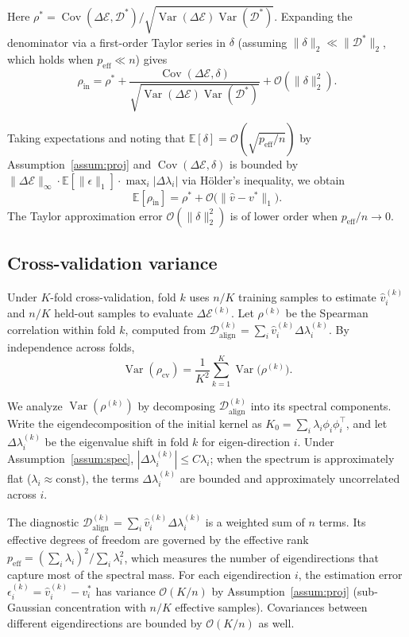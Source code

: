 \documentclass[twoside,11pt]{article}
\begin{document}
Here $\rho^* = \operatorname{Cov}(\Delta\mathcal{E}, \mathcal{D}^*) / \sqrt{\operatorname{Var}(\Delta\mathcal{E})\operatorname{Var}(\mathcal{D}^*)}$. Expanding the denominator via a first-order Taylor series in $\delta$ (assuming $\|\delta\|_2 \ll \|\mathcal{D}^*\|_2$, which holds when $p_{\text{eff}} \ll n$) gives
\[
\rho_{\text{in}} = \rho^* + \frac{\operatorname{Cov}(\Delta\mathcal{E}, \delta)}{\sqrt{\operatorname{Var}(\Delta\mathcal{E})\operatorname{Var}(\mathcal{D}^*)}} + \mathcal{O}(\|\delta\|_2^2).
\]

Taking expectations and noting that $\mathbb{E}[\delta] = \mathcal{O}(\sqrt{p_{\text{eff}}/n})$ by Assumption~\ref{assum:proj} and $\operatorname{Cov}(\Delta\mathcal{E}, \delta)$ is bounded by $\|\Delta\mathcal{E}\|_{\infty} \cdot \mathbb{E}[\|\epsilon\|_1] \cdot \max_i |\Delta\lambda_i|$ via H\"older's inequality, we obtain
\[
\mathbb{E}[\rho_{\text{in}}] = \rho^* + \mathcal{O}\bigl(\|\hat{v} - v^*\|_1\bigr).
\]
The Taylor approximation error $\mathcal{O}(\|\delta\|_2^2)$ is of lower order when $p_{\text{eff}}/n \to 0$.

\subsection{Cross-validation variance}

Under $K$-fold cross-validation, fold $k$ uses $n/K$ training samples to estimate $\hat{v}_i^{(k)}$ and $n/K$ held-out samples to evaluate $\Delta\mathcal{E}^{(k)}$. Let $\rho^{(k)}$ be the Spearman correlation within fold $k$, computed from $\mathcal{D}_{\text{align}}^{(k)} = \sum_i \hat{v}_i^{(k)} \Delta\lambda_i^{(k)}$. By independence across folds,
\[
\operatorname{Var}(\rho_{\text{cv}}) = \frac{1}{K^2} \sum_{k=1}^K \operatorname{Var}\bigl(\rho^{(k)}\bigr).
\]

We analyze $\operatorname{Var}(\rho^{(k)})$ by decomposing $\mathcal{D}_{\text{align}}^{(k)}$ into its spectral components. Write the eigendecomposition of the initial kernel as $K_0 = \sum_i \lambda_i \phi_i\phi_i^\top$, and let $\Delta\lambda_i^{(k)}$ be the eigenvalue shift in fold $k$ for eigen-direction $i$. Under Assumption~\ref{assum:spec}, $|\Delta\lambda_i^{(k)}| \leq C\lambda_i$; when the spectrum is approximately flat ($\lambda_i \approx \text{const}$), the terms $\Delta\lambda_i^{(k)}$ are bounded and approximately uncorrelated across $i$.

The diagnostic $\mathcal{D}_{\text{align}}^{(k)} = \sum_i \hat{v}_i^{(k)} \Delta\lambda_i^{(k)}$ is a weighted sum of $n$ terms. Its effective degrees of freedom are governed by the effective rank $p_{\text{eff}} = (\sum_i \lambda_i)^2 / \sum_i \lambda_i^2$, which measures the number of eigendirections that capture most of the spectral mass. For each eigendirection $i$, the estimation error $\epsilon_i^{(k)} = \hat{v}_i^{(k)} - v_i^*$ has variance $\mathcal{O}(K/n)$ by Assumption~\ref{assum:proj} (sub-Gaussian concentration with $n/K$ effective samples). Covariances between different eigendirections are bounded by $\mathcal{O}(K/n)$ as well.
\end{document}
